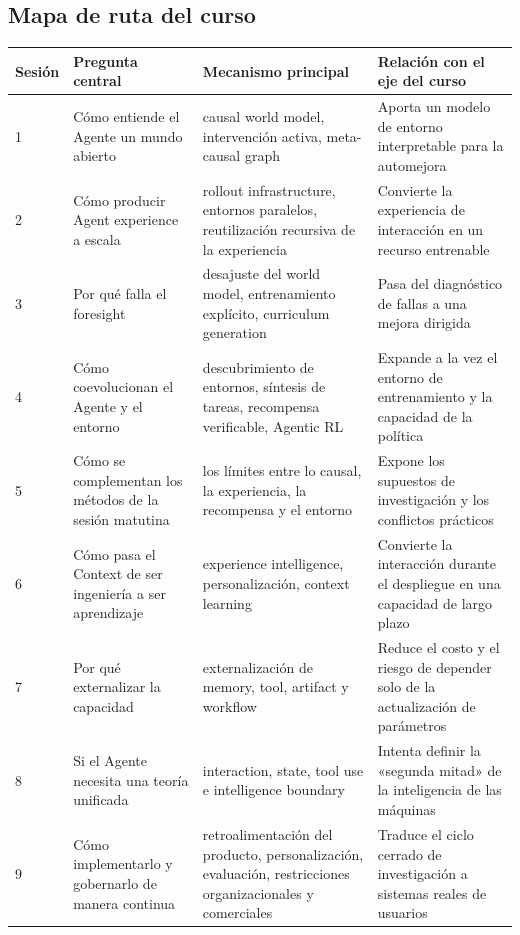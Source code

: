 \documentclass[a4paper]{article}
\begin{document}
\subsection{Mapa de ruta del curso}

\begin{longtable}{p{}p{}p{}p{}}
\toprule
Sesión & Pregunta central & Mecanismo principal & Relación con el eje del curso \\
\midrule
1 & Cómo entiende el Agente un mundo abierto & causal world model, intervención activa, meta-causal graph & Aporta un modelo de entorno interpretable para la automejora \\
2 & Cómo producir Agent experience a escala & rollout infrastructure, entornos paralelos, reutilización recursiva de la experiencia & Convierte la experiencia de interacción en un recurso entrenable \\
3 & Por qué falla el foresight & desajuste del world model, entrenamiento explícito, curriculum generation & Pasa del diagnóstico de fallas a una mejora dirigida \\
4 & Cómo coevolucionan el Agente y el entorno & descubrimiento de entornos, síntesis de tareas, recompensa verificable, Agentic RL & Expande a la vez el entorno de entrenamiento y la capacidad de la política \\
5 & Cómo se complementan los métodos de la sesión matutina & los límites entre lo causal, la experiencia, la recompensa y el entorno & Expone los supuestos de investigación y los conflictos prácticos \\
6 & Cómo pasa el Context de ser ingeniería a ser aprendizaje & experience intelligence, personalización, context learning & Convierte la interacción durante el despliegue en una capacidad de largo plazo \\
7 & Por qué externalizar la capacidad & externalización de memory, tool, artifact y workflow & Reduce el costo y el riesgo de depender solo de la actualización de parámetros \\
8 & Si el Agente necesita una teoría unificada & interaction, state, tool use e intelligence boundary & Intenta definir la «segunda mitad» de la inteligencia de las máquinas \\
9 & Cómo implementarlo y gobernarlo de manera continua & retroalimentación del producto, personalización, evaluación, restricciones organizacionales y comerciales & Traduce el ciclo cerrado de investigación a sistemas reales de usuarios \\
\bottomrule
\end{longtable}
\end{document}
